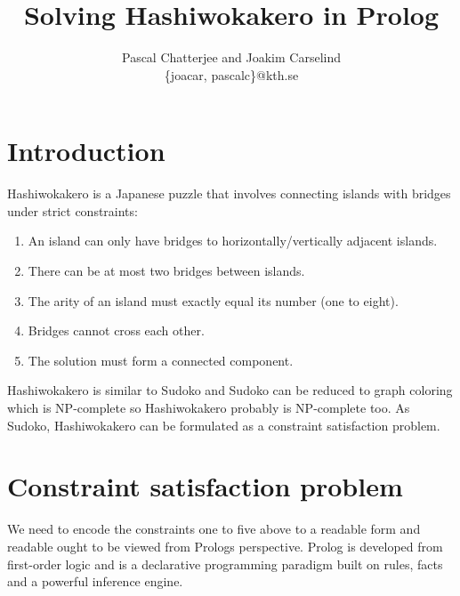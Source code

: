 \documentclass[a4paper,12pt]{article}
\title{Solving Hashiwokakero in Prolog}
\author{Pascal Chatterjee and Joakim Carselind \\ \small{\{joacar, pascalc\}@kth.se}}
\begin{document}
\maketitle

\section*{Introduction}
Hashiwokakero is a Japanese puzzle that involves connecting islands with bridges under strict constraints:
\begin{enumerate}
    \item An island can only have bridges to horizontally/vertically adjacent islands.
    \item There can be at most two bridges between islands.
    \item The arity of an island must exactly equal its number (one to eight).
    \item Bridges cannot cross each other.
    \item The solution must form a connected component.

\end{enumerate}
Hashiwokakero is similar to Sudoko and Sudoko can be reduced to graph coloring which is NP-complete so Hashiwokakero probably is NP-complete too. As Sudoko, Hashiwokakero can be formulated as a constraint satisfaction problem.  

\section*{Constraint satisfaction problem}
We need to encode the constraints one to five above to a readable form and readable ought to be viewed from Prologs perspective. Prolog is developed from first-order logic and is a declarative programming paradigm built on rules, facts and a powerful inference engine.
\end{document}
